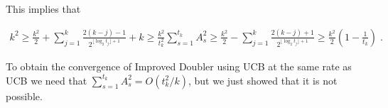 \documentclass{article}
\numberwithin{equation}{section}
\theoremstyle{plain}
\theoremstyle{plain}
\theoremstyle{plain}
\theoremstyle{remark}
\theoremstyle{remark}
\newcommand{\1}{\ensuremath{\mathbbm{1}}}
\begin{document}
This implies that 

\begin{eqnarray*}
k^{2} \geq \frac{k^{2}}{2}+\sum\limits_{j=1}^{k}\frac{2(k-j)-1}{2^{\lfloor\log_{2} t_{j}\rfloor+1}}+k \geq \frac{k^{2}}{t_{k}^{2}}\sum\limits_{s=1}^{t_{k}}A_{s}^{2} \geq \frac{k^{2}}{2}-\sum\limits_{j=1}^{k}\frac{2(k-j)+1}{2^{\lfloor\log_{2} t_{j}\rfloor+1}} \geq \frac{k^{2}}{2}\left(1-\frac{1}{t_{k}}\right) \;.
\end{eqnarray*}

To obtain the convergence of Improved Doubler using UCB at the same rate as UCB we need that $\sum_{s=1}^{t_{k}}A_{s}^{2}=O(t_{k}^{2}/k)$, but we just showed that it is not possible. 





\end{document}
